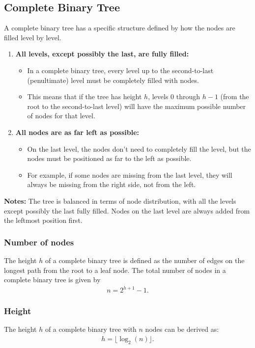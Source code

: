 \documentclass{report}
\begin{document}
\subsection{Complete Binary Tree}
\bigbreak \noindent 
A complete binary tree has a specific structure defined by how the nodes are filled level by level.
\begin{enumerate}
    \item \textbf{All levels, except possibly the last, are fully filled:}
        \begin{itemize}
            \item In a complete binary tree, every level up to the second-to-last (penultimate) level must be completely filled with nodes.
            \item This means that if the tree has height $h$, levels $0$ through $h - 1$ (from the root to the second-to-last level) will have the maximum possible number of nodes for that level.
        \end{itemize}
        \item \textbf{All nodes are as far left as possible:}
            \begin{itemize}
                \item On the last level, the nodes don't need to completely fill the level, but the nodes must be positioned as far to the left as possible.
                \item For example, if some nodes are missing from the last level, they will always be missing from the right side, not from the left.
            \end{itemize}
\end{enumerate}
\bigbreak \noindent 
\textbf{Notes:} The tree is balanced in terms of node distribution, with all the levels except possibly the last fully filled.
\bigbreak \noindent 
Nodes on the last level are always added from the leftmost position first.

\bigbreak \noindent 
\subsubsection{Number of nodes}
\bigbreak \noindent 
The height $h$ of a complete binary tree is defined as the number of edges on the longest path from the root to a leaf node.
\bigbreak \noindent 
The total number of nodes in a complete binary tree is given by
\begin{align*}
    n = 2^{h+1} - 1
.\end{align*}
\bigbreak \noindent 
\subsubsection{Height}
\bigbreak \noindent 
The height $h$ of a complete binary tree with $n$ nodes can be derived as:
\begin{align*}
   h = \lfloor \log_{2}(n) \rfloor
.\end{align*}
\end{document}
